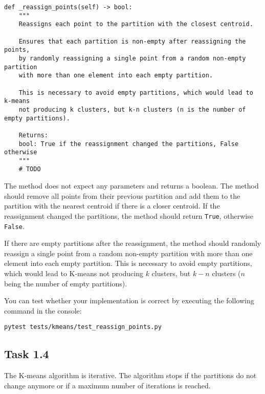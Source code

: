 \documentclass[
english,
smallborders
]{i6prcsht}
\begin{document}
\vspace*{0.3cm}

\begin{lstlisting}
def _reassign_points(self) -> bool:
	"""
	Reassigns each point to the partition with the closest centroid.

	Ensures that each partition is non-empty after reassigning the points,
	by randomly reassigning a single point from a random non-empty partition
	with more than one element into each empty partition.

	This is necessary to avoid empty partitions, which would lead to k-means
	not producing k clusters, but k-n clusters (n is the number of empty partitions).

	Returns:
	bool: True if the reassignment changed the partitions, False otherwise
	"""
	# TODO
\end{lstlisting}

\vspace*{0.1cm}

The method does not expect any parameters and returns a boolean. The method should remove all points from their previous partition and add them to the partition with the nearest centroid if there is a closer centroid. If the reassignment changed the partitions, the method should return \texttt{True}, otherwise \texttt{False}.

If there are empty partitions after the reassignment, the method should randomly reassign a single point from a random non-empty partition with more than one element into each empty partition. This is necessary to avoid empty partitions, which would lead to K-means not producing $k$ clusters, but $k-n$ clusters ($n$ being the number of empty partitions).

You can test whether your implementation is correct by executing the following command in the console:

\vspace*{0.3cm}

\begin{lstlisting}
pytest tests/kmeans/test_reassign_points.py
\end{lstlisting}

\vspace*{0.1cm}

\subsection*{Task 1.4}

The K-means algorithm is iterative. The algorithm stops if the partitions do not change anymore or if a maximum number of iterations is reached.
\end{document}
